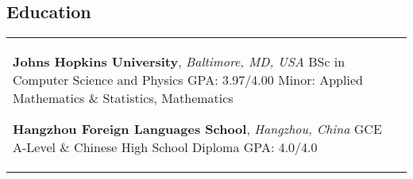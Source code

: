 \begin{paracol}{1}



  \section{Education}





  \begin{supertabular}{L{4cm}@{\hskip 0.3in}L{13cm}} %




                   {\textbf{Johns Hopkins University}, \textit{Baltimore, MD, USA}} %
                   {BSc in Computer Science and Physics} %
                   {GPA: 3.97/4.00} %
                   {Minor: Applied Mathematics \& Statistics, Mathematics} %


                                  {\textbf{Hangzhou Foreign Languages School}, \textit{Hangzhou, China}} %
                                  {GCE A-Level \& Chinese High School Diploma}
                                  {GPA: 4.0/4.0}
                                  { }


\end{supertabular}
\end{paracol}
